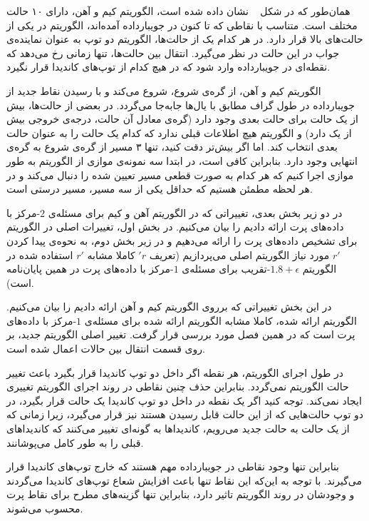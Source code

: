 همان‌طور که در شکل ~ نشان داده شده است، الگوریتم کیم و آهن، دارای ۱۰ حالت مختلف است. متناسب با نقاطی که تا کنون در جویبارداده آمده‌اند، الگوریتم در یکی از حالت‌های بالا قرار دارد. در هر کدام‌ یک از حالت‌‌ها، الگوریتم دو توپ به عنوان نماینده‌ی جواب در این حالت در نظر می‌گیرد. انتقال بین حالت‌ها، تنها زمانی رخ می‌دهد که نقطه‌ای در جویبارداده وارد شود که در هیچ‌ کدام از توپ‌های کاندیدا قرار نگیرد.

الگوریتم کیم و آهن، از گره‌ی شروع، شروع می‌کند و با رسیدن نقاط جدید از جویبارداده در طول گراف مطابق‌ با یال‌ها جابه‌جا می‌گردد. در بعضی از حالت‌ها، بیش از یک حالت برای حالت بعدی وجود دارد (گره‌ی معادل آن حالت، درجه‌ی خروجی بیش از یک دارد) و الگوریتم هیچ اطلاعات قبلی ندارد که کدام یک حالت را به عنوان حالت بعدی انتخاب کند. اما اگر بیش‌تر دقت کنید، تنها ۳ مسیر از گره‌ی شروع به گره‌ی انتهایی وجود دارد. بنابراین کافی است، در ابتدا سه نمونه‌ی موازی از الگوریتم به طور موازی اجرا کنیم که هر کدام به صورت قطعی مسیر تعیین شده را دنبال می‌کند و در هر لحظه مطمئن هستیم که حداقل یکی از سه مسیر، مسیر درستی است.

در دو زیر بخش بعدی، تغییراتی که در الگوریتم آهن و کیم برای مسئله‌ی $2$-مرکز با داده‌های پرت ارائه دادیم را بیان می‌کنیم. در بخش اول، تغییرات اصلی در الگوریتم برای تشخیص داده‌های پرت را ارائه می‌دهیم و در زیر بخش دوم، به نحوه‌ی پیدا کردن $r'$ مورد نیاز الگوریتم اصلی می‌پردازیم (تعریف $'r$ کاملا مشابه $r'$ استفاده شده در الگوریتم $1.8 + \epsilon$-تقریب برای مسئله‌ی $1$-مرکز با داده‌های پرت در همین پایان‌نامه است).


در این بخش تغییراتی که برروی الگوریتم کیم و آهن ارائه دادیم را بیان می‌کنیم. الگوریتم ارائه شده، کاملا مشابه الگوریتم ارائه شده برای مسئله‌ی $1$-مرکز با داده‌های پرت است که در همین فصل مورد بررسی قرار گرفت. تغییر اصلی الگوریتم جدید، بر روی قسمت انتقال بین حالات اعمال شده است. 

در طول اجرای الگوریتم، هر نقطه اگر داخل دو توپ کاندیدا قرار بگیرد باعث تغییر حالت الگوریتم نمی‌گردد. بنابراین حذف چنین نقاطی در روند اجرای الگوریتم تغییری ایجاد نمی‌کند. توجه کنید اگر یک نقطه در داخل دو توپ کاندیدا یک حالت قرار بگیرد، در دو توپ حالت‌هایی که از این حالت قابل رسیدن هستند نیز‌ قرار می‌گیرد، زیرا زمانی که از یک حالت به حالت جدید می‌رویم، کاندیداها به گونه‌ای تغییر می‌کنند که کاندیدا‌های قبلی را به طور کامل می‌پوشانند.

بنابراین تنها وجود نقاطی در جویبارداده مهم هستند که خارج توپ‌های کاندیدا قرار می‌گیرند. با توجه به این‌که این نقاط تنها باعث افزایش شعاع توپ‌های کاندیدا می‌گردند و وجودشان در روند الگوریتم تاثیر دارد، بنابراین تنها گزینه‌های مطرح برای نقاط پرت محسوب می‌شوند. 

